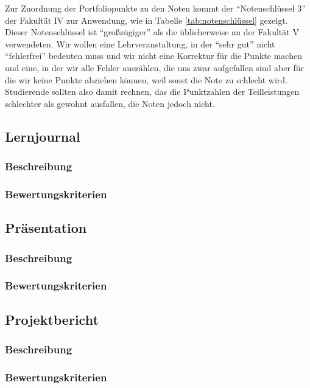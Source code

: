 \documentclass[DIV=15,headinclude]{scrartcl}
\begin{document}
Zur Zuordnung der Portfoliopunkte zu den Noten kommt der "`Notenschlüssel 3"' der Fakultät IV zur Anwendung, wie in Tabelle \ref{tab:notenschlüssel} gezeigt. Dieser Notenschlüssel ist "`großzügiger"' als die üblicherweise an der Fakultät V verwendeten. Wir wollen eine Lehrveranstaltung, in der "`sehr gut"' nicht "`fehlerfrei"' bedeuten muss und wir nicht eine Korrektur für die Punkte machen und eine, in der wir alle Fehler auszählen, die uns zwar aufgefallen sind aber für die wir keine Punkte abziehen können, weil sonst die Note zu schlecht wird. Studierende sollten also damit rechnen, das die Punktzahlen der Teilleistungen schlechter als gewohnt ausfallen, die Noten jedoch nicht.

\subsection{Lernjournal}

\subsubsection{Beschreibung}

\subsubsection{Bewertungskriterien}

\subsection{Präsentation}

\subsubsection{Beschreibung}

\subsubsection{Bewertungskriterien}

\subsection{Projektbericht}

\subsubsection{Beschreibung}

\subsubsection{Bewertungskriterien}



\end{document}
